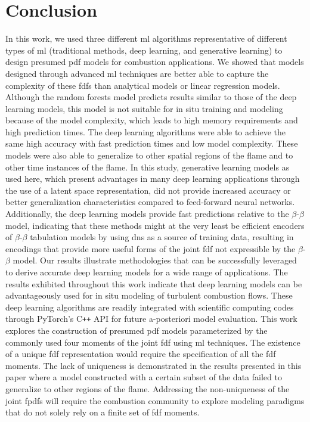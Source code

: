 \documentclass[review]{elsarticle}
\begin{document}
\section{Conclusion}\label{sec:ccl}

In this work, we used three different \gls{ml} algorithms
representative of different types of \gls{ml} (traditional methods,
deep learning, and generative learning) to design presumed \gls{pdf}
models for combustion applications. We showed that models designed
through advanced \gls{ml} techniques are better able to capture the
complexity of these \glspl{fdf} than analytical models or linear
regression models. Although the random forests model predicts results
similar to those of the deep learning models, this model is not
suitable for in situ training and modeling because of the model
complexity, which leads to high memory requirements and high
prediction times. The deep learning algorithms were able to achieve
the same high accuracy with fast prediction times and low model
complexity. These models were also able to generalize to other spatial
regions of the flame and to other time instances of the flame.  In
this study, generative learning models as used here, which present
advantages in many deep learning applications through the use of a
latent space representation, did not provide increased accuracy or
better generalization characteristics compared to feed-forward neural
networks. Additionally, the deep learning models provide fast
predictions relative to the $\beta$-$\beta$ model, indicating that
these methods might at the very least be efficient encoders of
$\beta$-$\beta$ tabulation models by using \gls{dns} as a source of
training data, resulting in encodings that provide more useful forms
of the joint \gls{fdf} not expressible by the $\beta$-$\beta$
model. Our results illustrate methodologies that can be successfully
leveraged to derive accurate deep learning models for a wide range of
applications. The results exhibited throughout this work indicate that
deep learning models can be advantageously used for in situ modeling
of turbulent combustion flows. These deep learning algorithms are
readily integrated with scientific computing codes through PyTorch's
C\texttt{++} API for future a-posteriori model evaluation. This work
explores the construction of presumed \gls{pdf} models parameterized
by the commonly used four moments of the joint \gls{fdf} using
\gls{ml} techniques. The existence of a unique \gls{fdf}
representation would require the specification of all the \gls{fdf}
moments. The lack of uniqueness is demonstrated in the results
presented in this paper where a model constructed with a certain
subset of the data failed to generalize to other regions of the
flame. Addressing the non-uniqueness of the joint \glspl{fpdf} will
require the combustion community to explore modeling paradigms that do
not solely rely on a finite set of \gls{fdf} moments.
\end{document}
